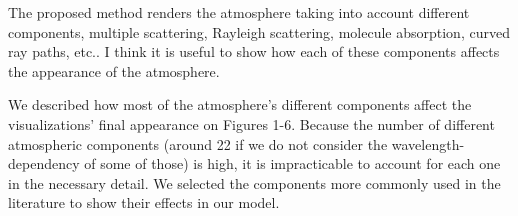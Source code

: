 \documentclass{article}
\begin{document}
\vspace*{1cm}
\begin{tcolorbox}
The proposed method renders the atmosphere taking into account different components, multiple scattering, Rayleigh scattering, molecule absorption, curved ray paths, etc.. I think it is useful to show how each of these components affects the appearance of the atmosphere.
\end{tcolorbox}

We described how most of the atmosphere's different components affect the visualizations' final appearance on Figures 1-6. Because the number of different atmospheric components (around 22 if we do not consider the wavelength-dependency of some of those) is high, it is impracticable to account for each one in the necessary detail.
We selected the components more commonly used in the literature to show their effects in our model. 
 
 
 
\end{document}
